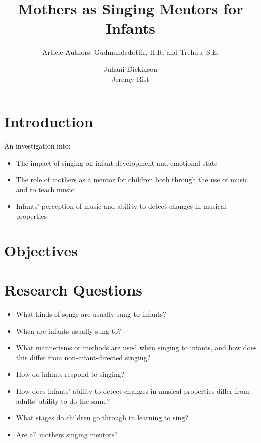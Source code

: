\documentclass{beamer}
\title{Mothers as Singing Mentors for Infants}
\subtitle{Article Authors: Gudmundsdottir, H.R. and Trehub, S.E.}
\author[Juhani Dickinson, Jeremy Rist]{Juhani Dickinson \\ Jeremy Rist}
\begin{document}
\begin{frame}
	\titlepage
\end{frame}


\section{Introduction}
\begin{frame}
	An investigation into:
	\begin{itemize}
		\item The impact of singing on infant development and emotional state
		\item The role of mothers as a mentor for children both through the use of music and to teach music
		\item Infants' perception of music and ability to detect changes in musical properties
	\end{itemize}
\end{frame}

\section{Objectives}
\begin{frame}
\end{frame}

\section{Research Questions}
\begin{frame}
	\begin{itemize}
		\item What kinds of songs are usually sung to infants?
		\item When are infants usually sung to?
		\item What mannerisms or methods are used when singing to infants, and how does this differ from non-infant-directed singing?
		\item How do infants respond to singing?
		\item How does infants' ability to detect changes in musical properties differ from adults' ability to do the same? %
		\item What stages do children go through in learning to sing?
		\item Are all mothers singing mentors?
	\end{itemize}
\end{frame}
\end{document}
